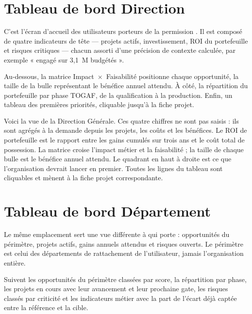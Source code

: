 \section{Tableau de bord Direction}

C'est l'écran d'accueil des utilisateurs porteurs de la permission
. Il est composé de quatre indicateurs de tête — projets
actifs, investissement, ROI du portefeuille et risques critiques — chacun assorti d'une
précision de contexte calculée, par exemple « engagé sur 3,1~M\texteuro{} budgétés ».

Au-dessous, la matrice Impact~$\times$~Faisabilité positionne chaque opportunité, la
taille de la bulle représentant le bénéfice annuel attendu. À côté, la répartition du
portefeuille par phase TOGAF, de la qualification à la production. Enfin, un tableau des
premières priorités, cliquable jusqu'à la fiche projet.


\begin{oral}
Voici la vue de la Direction Générale. Ces quatre chiffres ne sont pas saisis : ils sont
agrégés à la demande depuis les projets, les coûts et les bénéfices. Le ROI de
portefeuille est le rapport entre les gains cumulés sur trois ans et le coût total de
possession. La matrice croise l'impact métier et la faisabilité ; la taille de chaque
bulle est le bénéfice annuel attendu. Le quadrant en haut à droite est ce que
l'organisation devrait lancer en premier. Toutes les lignes du tableau sont cliquables
et mènent à la fiche projet correspondante.
\end{oral}

\section{Tableau de bord Département}

Le même emplacement sert une vue différente à qui porte
 : opportunités du périmètre, projets actifs, gains annuels
attendus et risques ouverts. Le périmètre est celui des départements de rattachement de
l'utilisateur, jamais l'organisation entière.

Suivent les opportunités du périmètre classées par score, la répartition par phase, les
projets en cours avec leur avancement et leur prochaine gate, les risques classés par
criticité et les indicateurs métier avec la part de l'écart déjà captée entre la
référence et la cible.

